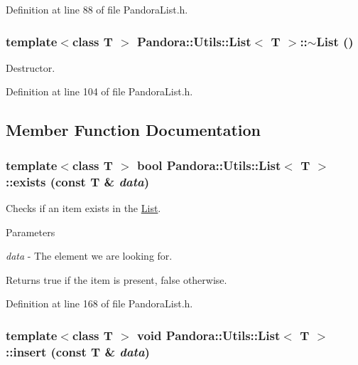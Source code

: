 Definition at line 88 of file PandoraList.h.\hypertarget{classPandora_1_1Utils_1_1List_a4014a2867a09df28421939d4732a7907}{
\subsubsection[{$\sim$List}]{\setlength{\rightskip}{0pt plus 5cm}template$<$class T $>$ {\bf Pandora::Utils::List}$<$ T $>$::$\sim${\bf List} ()}}
\label{classPandora_1_1Utils_1_1List_a4014a2867a09df28421939d4732a7907}


Destructor. 

Definition at line 104 of file PandoraList.h.

\subsection{Member Function Documentation}
\hypertarget{classPandora_1_1Utils_1_1List_ad15fe96a79420346c975e96eb23f35ea}{
\subsubsection[{exists}]{\setlength{\rightskip}{0pt plus 5cm}template$<$class T $>$ bool {\bf Pandora::Utils::List}$<$ T $>$::exists (const T \& {\em data})}}
\label{classPandora_1_1Utils_1_1List_ad15fe96a79420346c975e96eb23f35ea}


Checks if an item exists in the \hyperlink{classPandora_1_1Utils_1_1List}{List}. 
\begin{DoxyParams}{Parameters}
\item[{\em data}]-\/ The element we are looking for. \end{DoxyParams}
\begin{DoxyReturn}{Returns}
true if the item is present, false otherwise. 
\end{DoxyReturn}


Definition at line 168 of file PandoraList.h.\hypertarget{classPandora_1_1Utils_1_1List_a613c9a325c0e2916241acbd453d7b295}{
\subsubsection[{insert}]{\setlength{\rightskip}{0pt plus 5cm}template$<$class T $>$ void {\bf Pandora::Utils::List}$<$ T $>$::insert (const T \& {\em data})}}
\label{classPandora_1_1Utils_1_1List_a613c9a325c0e2916241acbd453d7b295}



